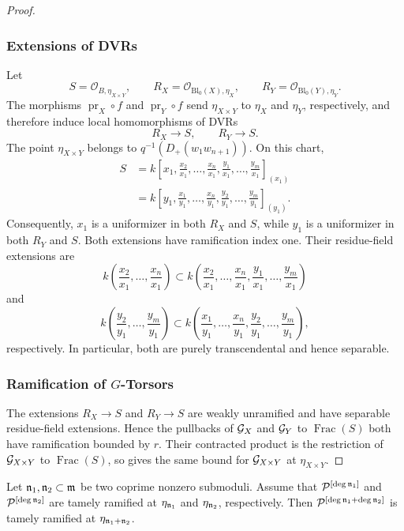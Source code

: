 \begin{proof}
\subsubsection*{Extensions of DVRs}
Let
\[
S=\mathcal O_{B,\eta_{X\times Y}},\qquad
R_X=\mathcal O_{\text{Bl}_0(X),\eta_X},\qquad
R_Y=\mathcal O_{\text{Bl}_0(Y),\eta_Y}.
\]
The morphisms $\operatorname{pr}_X\circ f$ and
$\operatorname{pr}_Y\circ f$ send $\eta_{X\times Y}$ to $\eta_X$ and
$\eta_Y$, respectively, and therefore induce local homomorphisms of DVRs
\[
    R_X\longrightarrow S,\qquad R_Y\longrightarrow S.
\]
The point $\eta_{X\times Y}$ belongs to
$q^{-1}(D_+(w_1w_{n+1}))$. On this chart,
\[
\begin{aligned}
S
&=k\left[
x_1,\frac{x_2}{x_1},\ldots,\frac{x_n}{x_1},
\frac{y_1}{x_1},\ldots,\frac{y_m}{x_1}
\right]_{(x_1)}\\
&=k\left[
y_1,\frac{x_1}{y_1},\ldots,\frac{x_n}{y_1},
\frac{y_2}{y_1},\ldots,\frac{y_m}{y_1}
\right]_{(y_1)}.
\end{aligned}
\]
Consequently, $x_1$ is a uniformizer in both $R_X$ and $S$, while $y_1$ is
a uniformizer in both $R_Y$ and $S$. Both extensions have ramification index
one. Their residue-field extensions are
\[
k\left(\frac{x_2}{x_1},\ldots,\frac{x_n}{x_1}\right)
\subset
k\left(\frac{x_2}{x_1},\ldots,\frac{x_n}{x_1},
        \frac{y_1}{x_1},\ldots,\frac{y_m}{x_1}\right)
\]
and
\[
k\left(\frac{y_2}{y_1},\ldots,\frac{y_m}{y_1}\right)
\subset
k\left(\frac{x_1}{y_1},\ldots,\frac{x_n}{y_1},
        \frac{y_2}{y_1},\ldots,\frac{y_m}{y_1}\right),
\]
respectively. In particular, both are purely transcendental and hence
separable.

\subsubsection*{Ramification of $G$-Torsors}
The extensions $R_X\to S$ and $R_Y\to S$ are weakly unramified and have
separable residue-field extensions. Hence the pullbacks of $\mathcal{G}_X$ and
$\mathcal{G}_Y$ to $\operatorname{Frac}(S)$ both have ramification bounded by $r$.
Their contracted product is the restriction of $\mathcal{G}_{X\times Y}$ to
$\operatorname{Frac}(S)$, so
 gives the same bound
for $\mathcal{G}_{X\times Y}$ at $\eta_{X\times Y}$.
\end{proof}

\begin{lemma}\label{lemma:moduli_reduction}
     Let $\mathfrak{n}_1, \mathfrak{n}_2 \subset \mathfrak{m}$ be two coprime nonzero
     submoduli. Assume that $\mathcal{P}^{[\deg \mathfrak{n}_1]}$ and
     $\mathcal{P}^{[\deg \mathfrak{n}_2]}$ are tamely ramified at $\eta_{\mathfrak{n}_1}$ and
     $\eta_{\mathfrak{n}_2}$, respectively. Then
     $\mathcal{P}^{[\deg \mathfrak{n}_1 + \deg \mathfrak{n}_2]}$ is tamely ramified at
     $\eta_{\mathfrak{n}_1 + \mathfrak{n}_2}$.
\end{lemma}

